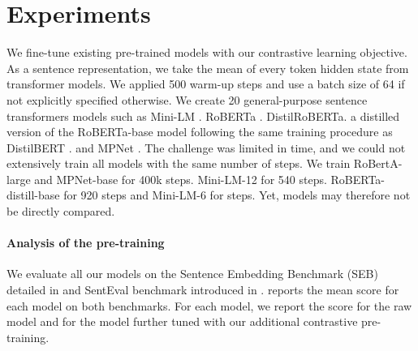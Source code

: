 \section{Experiments}

We fine-tune existing pre-trained models with our contrastive learning objective. As a sentence representation, we take the mean of every token hidden state from transformer models. We applied 500 warm-up steps and use a batch size of 64 if not explicitly specified otherwise. We create 20 general-purpose sentence transformers models such as Mini-LM \parencite{wang_20a}. RoBERTa \parencite{liu_2019}. DistilRoBERTa. a distilled version of the RoBERTa-base model following the same training procedure as DistilBERT \parencite{sanh_19}. and MPNet \parencite{song_20}. The challenge was limited in time, and we could not extensively train all models with the same number of steps. We train RoBertA-large and MPNet-base for 400k steps. Mini-LM-12 for 540 steps. RoBERTa-distill-base for 920 steps and Mini-LM-6 for  steps. Yet, models may therefore not be directly compared.



\paragraph{Analysis of the pre-training} We evaluate all our models on the Sentence Embedding Benchmark (SEB) detailed in  and SentEval benchmark introduced in .  reports the mean score for each model on both benchmarks. For each model, we report the score for the raw model and for the model further tuned with our additional contrastive pre-training.

